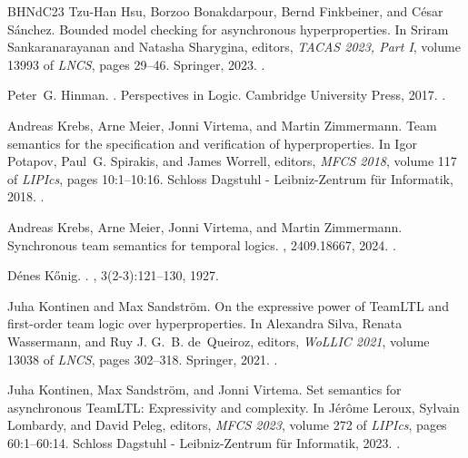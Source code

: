 \documentclass[dvipsnames,10pt,a4paper]{amsart}
\theoremstyle{definition}
\theoremstyle{remark}
\begin{document}
\begin{thebibliography}{BHNdC23}
Tzu{-}Han Hsu, Borzoo Bonakdarpour, Bernd Finkbeiner, and C{\'{e}}sar S{\'{a}}nchez.
\newblock Bounded model checking for asynchronous hyperproperties.
\newblock In Sriram Sankaranarayanan and Natasha Sharygina, editors, {\em {TACAS} 2023, Part {I}}, volume 13993 of {\em LNCS}, pages 29--46. Springer, 2023.
\newblock \href {https://doi.org/10.1007/978-3-031-30823-9\_2} {}.

Peter~G. Hinman.
.
\newblock Perspectives in Logic. Cambridge University Press, 2017.
\newblock \href {https://doi.org/10.1017/9781316717110} {}.

Andreas Krebs, Arne Meier, Jonni Virtema, and Martin Zimmermann.
\newblock Team semantics for the specification and verification of hyperproperties.
\newblock In Igor Potapov, Paul~G. Spirakis, and James Worrell, editors, {\em {MFCS} 2018}, volume 117 of {\em LIPIcs}, pages 10:1--10:16. Schloss Dagstuhl - Leibniz-Zentrum für Informatik, 2018.
\newblock \href {https://doi.org/10.4230/LIPIcs.MFCS.2018.10} {}.

Andreas Krebs, Arne Meier, Jonni Virtema, and Martin Zimmermann.
\newblock Synchronous team semantics for temporal logics.
, 2409.18667, 2024.
\newblock \href {https://doi.org/10.48550/ARXIV.2409.18667} {}.

D{\'e}nes K{\H o}nig.
.
, 3(2-3):121--130, 1927.

Juha Kontinen and Max Sandstr{\"{o}}m.
\newblock On the expressive power of {TeamLTL} and first-order team logic over hyperproperties.
\newblock In Alexandra Silva, Renata Wassermann, and Ruy J. G.~B. de~Queiroz, editors, {\em WoLLIC 2021}, volume 13038 of {\em LNCS}, pages 302--318. Springer, 2021.
\newblock \href {https://doi.org/10.1007/978-3-030-88853-4\_19} {}.

Juha Kontinen, Max Sandstr{\"{o}}m, and Jonni Virtema.
\newblock Set semantics for asynchronous {TeamLTL}: Expressivity and complexity.
\newblock In J{\'{e}}r{\^{o}}me Leroux, Sylvain Lombardy, and David Peleg, editors, {\em {MFCS} 2023}, volume 272 of {\em LIPIcs}, pages 60:1--60:14. Schloss Dagstuhl - Leibniz-Zentrum für Informatik, 2023.
\newblock \href {https://doi.org/10.4230/LIPICS.MFCS.2023.60} {}.


\end{thebibliography}
\end{document}
